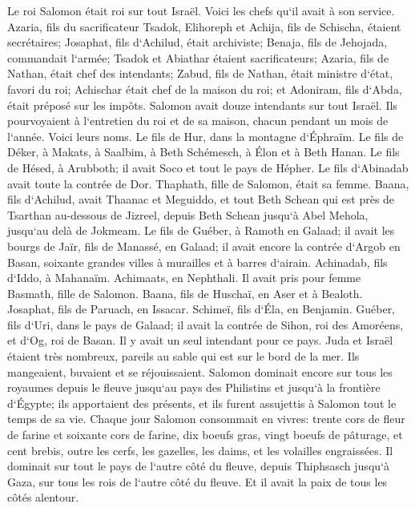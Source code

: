 \verse Le roi Salomon était roi sur tout Israël. 
\verse Voici les chefs qu`il avait à son service. Azaria, fils du sacrificateur Tsadok, 
\verse Elihoreph et Achija, fils de Schischa, étaient secrétaires; Josaphat, fils d`Achilud, était archiviste; 
\verse Benaja, fils de Jehojada, commandait l`armée; Tsadok et Abiathar étaient sacrificateurs; 
\verse Azaria, fils de Nathan, était chef des intendants; Zabud, fils de Nathan, était ministre d`état, favori du roi; 
\verse Achischar était chef de la maison du roi; et Adoniram, fils d`Abda, était préposé sur les impôts. 
\verse Salomon avait douze intendants sur tout Israël. Ils pourvoyaient à l`entretien du roi et de sa maison, chacun pendant un mois de l`année. 
\verse Voici leurs noms. Le fils de Hur, dans la montagne d`Éphraïm. 
\verse Le fils de Déker, à Makats, à Saalbim, à Beth Schémesch, à Élon et à Beth Hanan. 
\verse Le fils de Hésed, à Arubboth; il avait Soco et tout le pays de Hépher. 
\verse Le fils d`Abinadab avait toute la contrée de Dor. Thaphath, fille de Salomon, était sa femme. 
\verse Baana, fils d`Achilud, avait Thaanac et Meguiddo, et tout Beth Schean qui est près de Tsarthan au-dessous de Jizreel, depuis Beth Schean jusqu`à Abel Mehola, jusqu`au delà de Jokmeam. 
\verse Le fils de Guéber, à Ramoth en Galaad; il avait les bourgs de Jaïr, fils de Manassé, en Galaad; il avait encore la contrée d`Argob en Basan, soixante grandes villes à murailles et à barres d`airain. 
\verse Achinadab, fils d`Iddo, à Mahanaïm. 
\verse Achimaats, en Nephthali. Il avait pris pour femme Basmath, fille de Salomon. 
\verse Baana, fils de Huschaï, en Aser et à Bealoth. 
\verse Josaphat, fils de Paruach, en Issacar. 
\verse Schimeï, fils d`Éla, en Benjamin. 
\verse Guéber, fils d`Uri, dans le pays de Galaad; il avait la contrée de Sihon, roi des Amoréens, et d`Og, roi de Basan. Il y avait un seul intendant pour ce pays. 
\verse Juda et Israël étaient très nombreux, pareils au sable qui est sur le bord de la mer. Ils mangeaient, buvaient et se réjouissaient. 
\verse Salomon dominait encore sur tous les royaumes depuis le fleuve jusqu`au pays des Philistins et jusqu`à la frontière d`Égypte; ils apportaient des présents, et ils furent assujettis à Salomon tout le temps de sa vie. 
\verse Chaque jour Salomon consommait en vivres: trente cors de fleur de farine et soixante cors de farine, 
\verse dix boeufs gras, vingt boeufs de pâturage, et cent brebis, outre les cerfs, les gazelles, les daims, et les volailles engraissées. 
\verse Il dominait sur tout le pays de l`autre côté du fleuve, depuis Thiphsasch jusqu`à Gaza, sur tous les rois de l`autre côté du fleuve. Et il avait la paix de tous les côtés alentour. 
